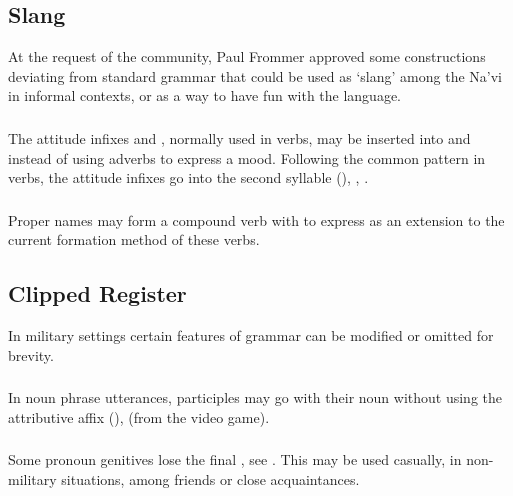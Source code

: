 \subsection{Slang} At the request of the community, Paul Frommer approved
some constructions deviating from standard grammar that could be used
as `slang' among the Na'vi in informal contexts, or as a way to have
fun with the language.

\subsubsection{}The attitude infixes  and ,
normally used in verbs, may be inserted into  
and   instead of using adverbs to express a mood.
Following the common pattern in verbs, the attitude infixes go into
the second syllable (),
, . 

\subsubsection{}Proper names may form a compound verb with  to
express  as an extension to the current formation method of
these verbs.


\subsection{Clipped Register} In military settings certain features of
grammar can be modified or omitted for brevity.

\subsubsection{} In noun phrase utterances, participles may go with
their noun without using the attri\-bu\-tive affix 
(),   (from
the video game).

\subsubsection{} Some pronoun genitives lose the final , see
.  This may be used casually, in
non-military situations, among friends or close acquaintances.

